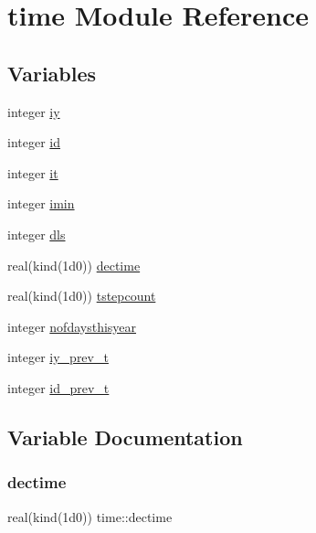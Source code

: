 \hypertarget{namespacetime}{}\section{time Module Reference}
\label{namespacetime}
\subsection*{Variables}
\begin{DoxyCompactItemize}
\item 
integer \hyperlink{namespacetime_a7dd4adda8e1403aee1caa796036c7204}{iy}
\item 
integer \hyperlink{namespacetime_abc3475e9770d0639f41dad7382bcb6d0}{id}
\item 
integer \hyperlink{namespacetime_a88a6c141593462330d65da0397b9b71d}{it}
\item 
integer \hyperlink{namespacetime_a9be08cae4e706325fe3524f4370754cc}{imin}
\item 
integer \hyperlink{namespacetime_a0985b09f5d79535bd56787cb3c82cfd0}{dls}
\item 
real(kind(1d0)) \hyperlink{namespacetime_acf0bd1b102769fcbe36a171b4b9e2a25}{dectime}
\item 
real(kind(1d0)) \hyperlink{namespacetime_a1e5711f85b68a21c078ff31788e419a8}{tstepcount}
\item 
integer \hyperlink{namespacetime_a2fa97bd4906ad27fe47d4699afc88fe2}{nofdaysthisyear}
\item 
integer \hyperlink{namespacetime_a6c4033d0e3f01ba6ea142f00749d0e4e}{iy\+\_\+prev\+\_\+t}
\item 
integer \hyperlink{namespacetime_a12b68236a1014f7a9cee2fac8b4aa5f0}{id\+\_\+prev\+\_\+t}
\end{DoxyCompactItemize}


\subsection{Variable Documentation}
\mbox{\label{namespacetime_acf0bd1b102769fcbe36a171b4b9e2a25}} 
\subsubsection{\texorpdfstring{dectime}{dectime}}
{\footnotesize\ttfamily real(kind(1d0)) time\+::dectime}



